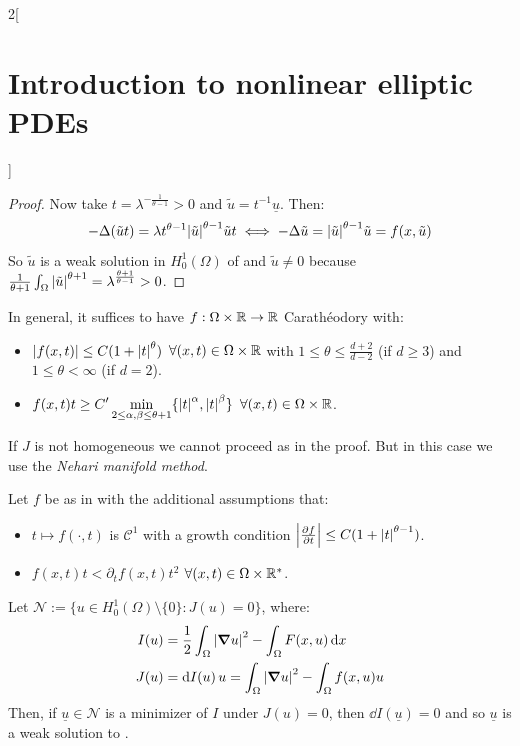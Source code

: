\documentclass[../../../main_math.tex]{subfiles}
\begin{document}
\begin{multicols}{2}[\section{Introduction to nonlinear elliptic PDEs}]
\begin{proof}
    Now take $t=\lambda^{-\frac{1}{\theta-1}}>0$ and $\tilde{u}=t^{-1}\underline{u}$. Then:
    $$
      -\Delta(\tilde{u}t)=\lambda t^{\theta-1}\abs{\tilde{u}}^{\theta-1}\tilde{u}t\iff -\Delta \tilde{u}= \abs{\tilde{u}}^{\theta-1}\tilde{u}=f(x,\tilde{u})
    $$
    So $\tilde{u}$ is a weak solution in $H_0^1(\Omega)$ of  and $\tilde{u}\ne 0$ because $\frac{1}{\theta+1}\int_\Omega \abs{\tilde{u}}^{\theta+1}=\lambda^{\frac{\theta+1}{\theta-1}}>0$.
  \end{proof}
  \begin{remark}
    In general, it suffices to have $f:\Omega\times \mathbb{R}\to\mathbb{R}$ Carathéodory with:
    \begin{itemize}
      \item $\abs{f(x,t)}\leq C(1+\abs{t}^\theta)$ $\forall (x,t)\in \Omega\times \mathbb{R}$ with $1\leq \theta\leq \frac{d+2}{d-2}$ (if $d\geq 3$) and $1\leq \theta<\infty$ (if $d=2$).
      \item $\displaystyle f(x,t)t\geq C'\min_{2\leq \alpha,\beta\leq \theta+1}\{\abs{t}^\alpha,\abs{t}^\beta\}$ $\forall (x,t)\in \Omega\times \mathbb{R}$.
    \end{itemize}
  \end{remark}
  \begin{remark}
    If $J$ is not homogeneous we cannot proceed as in the proof. But in this case we use the \emph{Nehari manifold method}.
  \end{remark}
  \begin{proposition}
    Let $f$ be as in  with the additional assumptions that:
    \begin{itemize}
      \item $t\mapsto f(\cdot,t)$ is $\mathcal{C}^1$ with a growth condition $\abs{\pdv{f}{t}}\leq C(1+\abs{t}^{\theta-1})$.
      \item $f(x,t)t< \partial_tf(x,t)t^2$ $\forall (x,t)\in \Omega\times \mathbb{R}^*$.
    \end{itemize}
    Let $\mathcal{N}:=\{u\in H_0^1(\Omega)\setminus\{0\}:J(u)=0\}$, where:
    \begin{align*}
      I(u) & =\frac{1}{2}\int_\Omega \abs{\grad u}^2-\int_\Omega F(x,u)\dd{x} \\
      J(u) & =\dd{I(u)}u = \int_\Omega \abs{\grad u}^2 -\int_\Omega f(x,u)u
    \end{align*}
    Then, if $\underline{u}\in\mathcal{N}$ is a minimizer of $I$ under $J(u)=0$, then $\dd{I(\underline{u})}=0$ and so $\underline{u}$ is a weak solution to .

\end{proposition}
\end{multicols}
\end{document}
